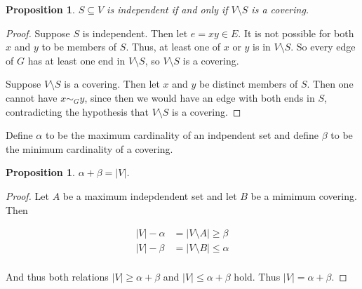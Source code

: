 \documentclass[12pt]{amsart}
\newtheorem{prop}[thm]{Proposition}
\theoremstyle{definition}
\begin{document}
\begin{prop}
$S \subseteq V$ is independent if and only if $V \setminus S$ is a covering.
\end{prop}

\begin{proof}
Suppose $S$ is independent. Then let $e = xy \in E$. It is not possible for both $x$ and
$y$ to be members of $S$. Thus, at least one of $x$ or $y$ is in $V \setminus S$. So every edge
of $G$ has at least one end in $V \setminus S$, so $V \setminus S$ is a covering.

Suppose $V \setminus S$ is a covering. Then let $x$ and $y$ be distinct members of $S$. Then one
cannot have $x \sim_G y$, since then we would have an edge with both ends in $S$, contradicting the
hypothesis that $V \setminus S$ is a covering.
\end{proof}

Define $\alpha$ to be the maximum cardinality of an indpendent set and define $\beta$ to be the
minimum cardinality of a covering.

\begin{prop}
$\alpha + \beta = |V|$.
\end{prop}

\begin{proof}
Let $A$ be a maximum indepdendent set and let $B$ be a mimimum covering. Then

\begin{align*}
	|V| - \alpha &= |V \setminus A| \geq \beta \\
	|V| - \beta  &= |V \setminus B| \leq \alpha \\
\end{align*}

And thus both relations $|V| \geq \alpha + \beta$ and $|V| \leq \alpha + \beta$ hold.
Thus $|V| = \alpha + \beta$.
\end{proof}
\end{document}
